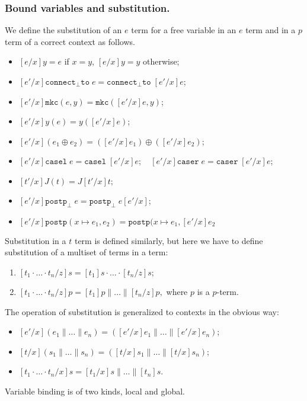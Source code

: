 \subsubsection{Bound variables and substitution.}
\begin{definition}
 We define the substitution of an $e$ term for a free variable in an $e$ term and in a $p$ term of a correct context as follows.  
 \begin{itemize}
\item $[e/x]y = e$ if $x = y$, $[e/x]y = y$ otherwise;
\item $[e'/x]\mathtt{connect}_{\bot} \mathtt{to}\; e = \mathtt{connect}_{\bot} \mathtt{to}\; [e'/x]e$;  
\item $[e'/x]\mathtt{mkc}(e,y) = \mathtt{mkc}([e'/x]e,y)$;
\item $[e'/x]y(e) = y([e'/x]e)$;
\item $[e'/x](e_1\oplus e_2) = ([e'/x]e_1)\oplus ([e'/x]e_2)$;
\item $[e'/x]\mathtt{casel}\;e = \mathtt{casel}\;[e'/x]e;\quad [e'/x]\mathtt{caser}\;e = \mathtt{caser}\;[e'/x]e$;  
\item $[t'/x] J(t) = J[t'/x]t; $
\item $[e'/x]\mathtt{postp}_{\bot}\; e = \mathtt{postp}_{\bot}\; e [e'/x]$; 
\item $[e'/x]\mathtt{postp}(x\mapsto e_1, e_2) = \mathtt{postp}(x\mapsto e_1,  [e'/x]e_2$
\end{itemize}
 \end{definition}
Substitution in a $t$ term is defined similarly, but here we have to define substitution of a multiset of terms in a term:
\begin{enumerate}
\item $[t_1\cdot\ldots\cdot t_n/ z]s = [t_1]s\cdot\ldots\cdot [t_n/ z]s;$
\item $[t_1\cdot\ldots\cdot t_n/ z]p = [t_1]p\| \ldots\| [t_n/ z]p,$ where $p$ is a $p$-term.
 \end{enumerate}
The operation of substitution is generalized to contexts in the obvious way: 
\begin{itemize}
\item $[e'/x](e_1 \| \ldots \| e_n) = ([e'/x]e_1 \| \ldots \| [e'/x]e_n)$;
\item $[t/x](s_1 \| \ldots \| s_n) = ([t/x]s_1 \| \ldots \| [t/x]s_n)$;
\item $[t_1\cdot \ldots \cdot t_n/x]s = [t_1/x]s \| \ldots \| [t_n]s$.
\end{itemize}
Variable binding is of two kinds, local and global.

